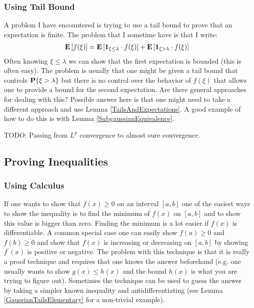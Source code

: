 \documentclass{amsart}
\theoremstyle{remark}
\theoremstyle{definition}
\begin{document}
\subsubsection{Using Tail Bound}
A problem I have encountered is trying to use a tail bound to prove
that an expectation is finite.  The problem that I sometime have is
that I write:
\begin{align*}
\textbf{E}\left[f(\xi)\right] = \textbf{E}\left[ \textbf{1}_{\xi \leq \lambda}
  \cdot f(\xi)\right] + \textbf{E}\left[\textbf{1}_{\xi > \lambda} \cdot f(\xi)\right]
\end{align*}
Often knowing $\xi \leq \lambda$ we can show that the first
expectation is bounded (this is often easy).  The problem is usually
that one might be given a tail bound that controls $\textbf{P}\{\xi >
  \lambda\}$ but there is no control over the behavior of $f(\xi)$ that
allows one to provide a bound for the second expectation.  Are there
general approaches for dealing with this?  Possible answer here is
that one might need to take a different approach and use Lemma
\ref{TailsAndExpectations}.  A good example of how to do this is with 
Lemma \ref{SubgaussianEquivalence}.

TODO: Passing from $L^p$ convergence to almost sure convergence.

\subsection{Proving Inequalities}
\subsubsection{Using Calculus}
If one wants to show that $f(x) \geq 0$ on an interval $[a,b]$ one of
the easiest ways to show the inequality is to find the minimum of
$f(x)$ on $[a,b]$ and to show this value is bigger than zero.  Finding
the minimum is a lot easier if $f(x)$ is differentiable.  A common
special case one can easily show $f(a) \geq 0$ and $f(b) \geq
0$ and show that $f(x)$ is increasing or decreasing on $[a,b]$ by
showing $f^{\prime}(x)$ is positive or negative.  The problem with
this technique is that it is really a proof technique and requires
that one knows the answer beforehand (e.g. one usually wants to show
$g(x) \leq h(x)$ and the bound $h(x)$ is what you are trying to figure
out).  Sometimes the technique can be
used to guess the answer by taking a simpler known inequality and
antidifferentiating (see Lemma \ref{GaussianTailsElementary} for a non-trivial example).
\end{document}
